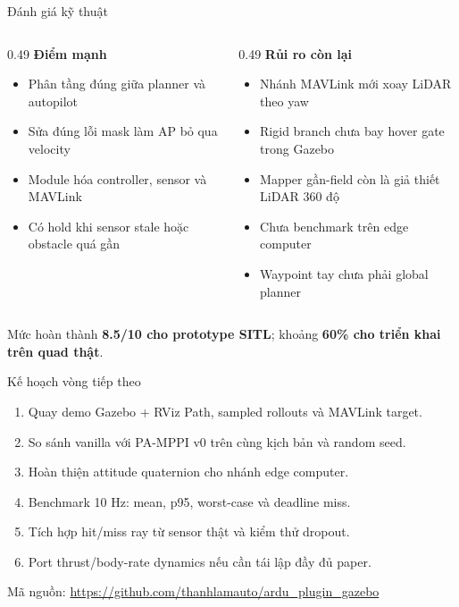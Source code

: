 \documentclass[aspectratio=169,11pt]{beamer}
\begin{document}
\begin{frame}{Đánh giá kỹ thuật}
  \begin{columns}[T,onlytextwidth]
    \begin{column}{0.49\textwidth}
      \textbf{Điểm mạnh}
      \begin{itemize}
        \item Phân tầng đúng giữa planner và autopilot
        \item Sửa đúng lỗi mask làm AP bỏ qua velocity
        \item Module hóa controller, sensor và MAVLink
        \item Có hold khi sensor stale hoặc obstacle quá gần
      \end{itemize}
    \end{column}
    \begin{column}{0.49\textwidth}
      \textbf{Rủi ro còn lại}
      \begin{itemize}
        \item Nhánh MAVLink mới xoay LiDAR theo yaw
        \item Rigid branch chưa bay hover gate trong Gazebo
        \item Mapper gần-field còn là giả thiết LiDAR 360 độ
        \item Chưa benchmark trên edge computer
        \item Waypoint tay chưa phải global planner
      \end{itemize}
    \end{column}
  \end{columns}

  \vspace{0.6em}
  \begin{block}{Mức hoàn thành}
    \textbf{8.5/10 cho prototype SITL}; khoảng \textbf{60\% cho triển khai trên
    quad thật}.
  \end{block}
\end{frame}

\begin{frame}{Kế hoạch vòng tiếp theo}
  \begin{enumerate}
    \item Quay demo Gazebo + RViz Path, sampled rollouts và MAVLink target.
    \item So sánh vanilla với PA-MPPI v0 trên cùng kịch bản và random seed.
    \item Hoàn thiện attitude quaternion cho nhánh edge computer.
    \item Benchmark 10 Hz: mean, p95, worst-case và
      deadline miss.
    \item Tích hợp hit/miss ray từ sensor thật và kiểm thử dropout.
    \item Port thrust/body-rate dynamics nếu cần tái lập đầy đủ paper.
  \end{enumerate}

  \vfill
  \footnotesize
  Mã nguồn: \url{https://github.com/thanhlamauto/ardu_plugin_gazebo}
\end{frame}
\end{document}
